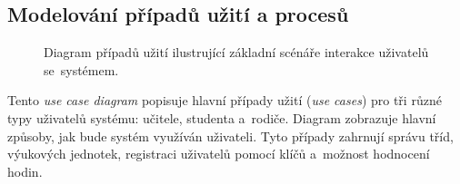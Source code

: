 \documentclass[male,czech,api_bc]{kitheses}
\begin{document}
\subsection{Modelování případů užití a procesů}

\begin{figure}[H]
	\centering
	\caption{Diagram případů užití ilustrující základní scénáře interakce uživatelů se~systémem.}
	\label{fig:use-case-diagram}
\end{figure}

Tento \textit{use case diagram} popisuje hlavní případy užití (\textit{use cases}) pro tři různé typy uživatelů systému: učitele, studenta a~rodiče. Diagram zobrazuje hlavní způsoby, jak bude systém využíván uživateli. Tyto případy zahrnují správu tříd, výukových jednotek, registraci uživatelů pomocí klíčů a~možnost hodnocení hodin.
\end{document}

